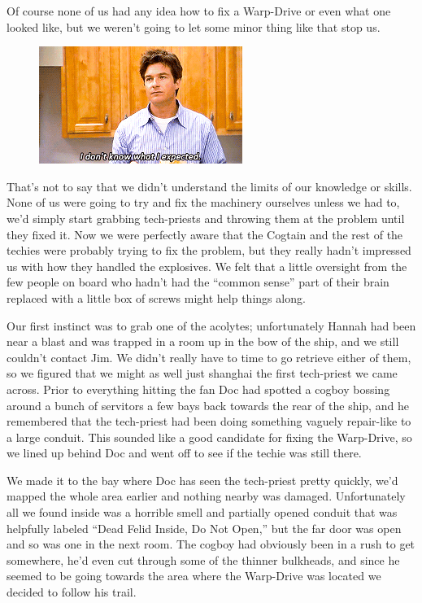 Of course none of us had any idea how to fix a Warp-Drive or even what one looked like, but we weren’t going to let some minor thing like that stop us.

\begin{figure}
	\begin{center}
		\includegraphics[width=\figwidth]{pics/7/21.png}
	\end{center}
\end{figure}
That’s not to say that we didn’t understand the limits of our knowledge or skills. 
None of us were going to try and fix the machinery ourselves unless we had to, we’d simply start grabbing tech-priests and throwing them at the problem until they fixed it. 
Now we were perfectly aware that the Cogtain and the rest of the techies were probably trying to fix the problem, but they really hadn’t impressed us with how they handled the explosives. 
We felt that a little oversight from the few people on board who hadn’t had the “common sense” part of their brain replaced with a little box of screws might help things along.

Our first instinct was to grab one of the acolytes; 
unfortunately Hannah had been near a blast and was trapped in a room up in the bow of the ship, and we still couldn’t contact Jim. 
We didn’t really have to time to go retrieve either of them, so we figured that we might as well just shanghai the first tech-priest we came across. 
Prior to everything hitting the fan Doc had spotted a cogboy bossing around a bunch of servitors a few bays back towards the rear of the ship, and he remembered that the tech-priest had been doing something vaguely repair-like to a large conduit. 
This sounded like a good candidate for fixing the Warp-Drive, so we lined up behind Doc and went off to see if the techie was still there.

We made it to the bay where Doc has seen the tech-priest pretty quickly, we’d mapped the whole area earlier and nothing nearby was damaged. 
Unfortunately all we found inside was a horrible smell and partially opened conduit that was helpfully labeled “Dead Felid Inside, Do Not Open,” but the far door was open and so was one in the next room. 
The cogboy had obviously been in a rush to get somewhere, he’d even cut through some of the thinner bulkheads, and since he seemed to be going towards the area where the Warp-Drive was located we decided to follow his trail.

